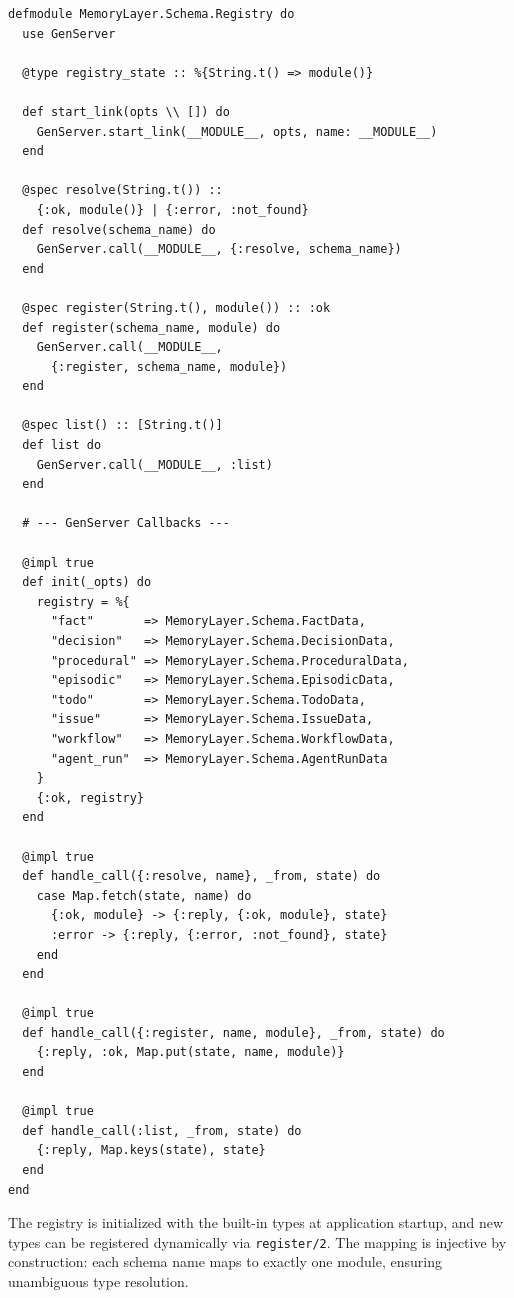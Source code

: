 \documentclass[12pt,a4paper]{article}
\theoremstyle{definition}
\begin{document}
\begin{lstlisting}[caption={Schema Registry: runtime type resolution.}, label={lst:registry}]
defmodule MemoryLayer.Schema.Registry do
  use GenServer

  @type registry_state :: %{String.t() => module()}

  def start_link(opts \\ []) do
    GenServer.start_link(__MODULE__, opts, name: __MODULE__)
  end

  @spec resolve(String.t()) ::
    {:ok, module()} | {:error, :not_found}
  def resolve(schema_name) do
    GenServer.call(__MODULE__, {:resolve, schema_name})
  end

  @spec register(String.t(), module()) :: :ok
  def register(schema_name, module) do
    GenServer.call(__MODULE__,
      {:register, schema_name, module})
  end

  @spec list() :: [String.t()]
  def list do
    GenServer.call(__MODULE__, :list)
  end

  # --- GenServer Callbacks ---

  @impl true
  def init(_opts) do
    registry = %{
      "fact"       => MemoryLayer.Schema.FactData,
      "decision"   => MemoryLayer.Schema.DecisionData,
      "procedural" => MemoryLayer.Schema.ProceduralData,
      "episodic"   => MemoryLayer.Schema.EpisodicData,
      "todo"       => MemoryLayer.Schema.TodoData,
      "issue"      => MemoryLayer.Schema.IssueData,
      "workflow"   => MemoryLayer.Schema.WorkflowData,
      "agent_run"  => MemoryLayer.Schema.AgentRunData
    }
    {:ok, registry}
  end

  @impl true
  def handle_call({:resolve, name}, _from, state) do
    case Map.fetch(state, name) do
      {:ok, module} -> {:reply, {:ok, module}, state}
      :error -> {:reply, {:error, :not_found}, state}
    end
  end

  @impl true
  def handle_call({:register, name, module}, _from, state) do
    {:reply, :ok, Map.put(state, name, module)}
  end

  @impl true
  def handle_call(:list, _from, state) do
    {:reply, Map.keys(state), state}
  end
end
\end{lstlisting}

The registry is initialized with the built-in types at application startup, and new types can be registered dynamically via \texttt{register/2}.
The mapping is injective by construction: each schema name maps to exactly one module, ensuring unambiguous type resolution.
\end{document}
